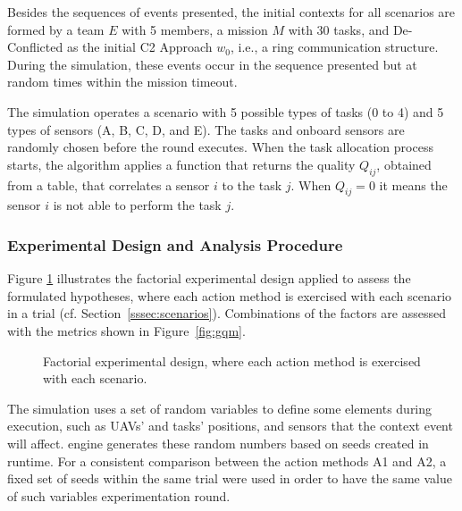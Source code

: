 Besides the sequences of events presented, the initial contexts for all scenarios are formed by a team $E$ with 5 members, a mission $M$ with 30 tasks, and De-Conflicted as the initial C2 Approach $w_0$, i.e., a ring communication structure. During the simulation, these events occur in the sequence presented but at random times within the mission timeout.





The simulation operates a scenario with 5 possible types of tasks (0 to 4) and 5 types of sensors (A, B, C, D, and E). The tasks and onboard sensors are randomly chosen \color{black}before the round executes\color{black}. When the \color{black} task allocation \color{black}process starts, the algorithm applies a function that returns the quality $Q_{ij}$, obtained from a table, that correlates a sensor $i$ to the task $j$. When $Q_{ij}=0$ it means the sensor $i$ is not able to perform the task $j$.



\subsubsection{Experimental Design and Analysis Procedure}
\label{sssec:design}


Figure \ref{fig:exp_design} illustrates the factorial experimental design applied to assess the formulated hypotheses, where each action method is exercised with each scenario in a trial (cf. Section~\ref{sssec:scenarios}). Combinations of the factors are assessed with the metrics shown in Figure~\ref{fig:gqm}.


\begin{figure}[ht]
    \centering
    \scalebox{.6}{}
    \caption{Factorial experimental design, where each action method is exercised with each scenario.}
    \label{fig:exp_design}
\end{figure}


The simulation uses a set of random variables to define some elements during execution, such as UAVs’ and tasks’ positions, and sensors that the context event will affect.  engine generates these random numbers based on seeds created in runtime. For a consistent comparison between the action methods A1 and A2, a fixed set of seeds within the same trial were used in order to have the same value of such variables  experimentation round.

